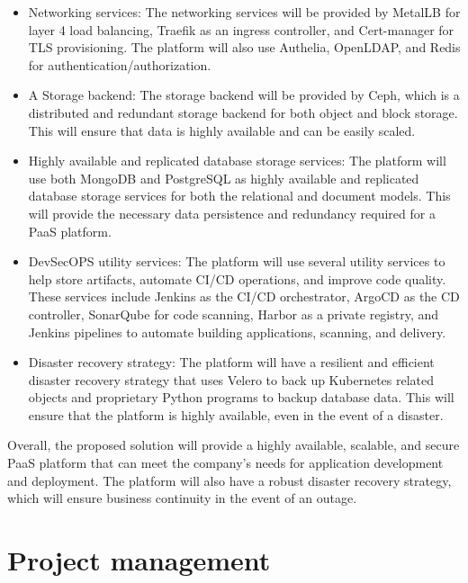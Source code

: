 \begin{itemize}[label={--}]

\item Networking services: The networking services will be provided by MetalLB for layer 4 load balancing, Traefik as an ingress controller, and Cert-manager for TLS provisioning. The platform will also use Authelia, OpenLDAP, and Redis for authentication/authorization. 

\item A Storage backend: The storage backend will be provided by Ceph, which is a distributed and redundant storage backend for both object and block storage. This will ensure that data is highly available and can be easily scaled. 

\item Highly available and replicated database storage services: The platform will use both MongoDB and PostgreSQL as highly available and replicated database storage services for both the relational and document models. This will provide the necessary data persistence and redundancy required for a PaaS platform. 

\item DevSecOPS utility services: The platform will use several utility services to help store artifacts, automate CI/CD operations, and improve code quality. These services include Jenkins as the CI/CD orchestrator, ArgoCD as the CD controller, SonarQube for code scanning, Harbor as a private registry, and Jenkins pipelines to automate building applications, scanning, and delivery. 

\item Disaster recovery strategy: The platform will have a resilient and efficient disaster recovery strategy that uses Velero to back up Kubernetes related objects and proprietary Python programs to backup database data. This will ensure that the platform is highly available, even in the event of a disaster. 

\end{itemize}

Overall, the proposed solution will provide a highly available, scalable, and secure PaaS platform that can meet the company's needs for application development and deployment. The platform will also have a robust disaster recovery strategy, which will ensure business continuity in the event of an outage.  


\newpage  %
\section{Project management }
